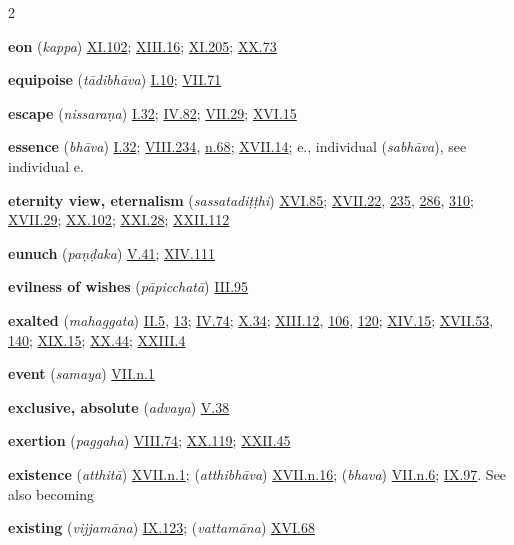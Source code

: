 \begin{multicols}{2}
\begin{vismHanging}
\par\textbf{eon} (\emph{kappa}) \hyperlink{XI.102}{XI.102}{}; \hyperlink{XIII.16}{XIII.16}{}; \hyperlink{XI.205}{XI.205}{}; \hyperlink{XX.73}{XX.73}{}
\par\textbf{equipoise} (\emph{tādibhāva}) \hyperlink{I.10}{I.10}{}; \hyperlink{VII.71}{VII.71}{}
\par\textbf{escape} (\emph{nissaraṇa}) \hyperlink{I.32}{I.32}{}; \hyperlink{IV.82}{IV.82}{}; \hyperlink{VII.29}{VII.29}{}; \hyperlink{XVI.15}{XVI.15}{}
\par\textbf{essence} (\emph{bhāva}) \hyperlink{I.32}{I.32}{}; \hyperlink{VIII.234}{VIII.234}{}, \hyperlink{VIII.n68}{n.68}{}; \hyperlink{XVII.14}{XVII.14}{}; e., individual (\emph{sabhāva}), see  individual e. 
\par\textbf{eternity view, eternalism} (\emph{sassatadiṭṭhi}) \hyperlink{XVI.85}{XVI.85}{}; \hyperlink{XVII.22}{XVII.22}{}, \hyperlink{XVII.235}{235}{}, \hyperlink{XVII.286}{286}{}, \hyperlink{XVII.310}{310}{}; \hyperlink{XVII.29}{XVII.29}{}; \hyperlink{XX.102}{XX.102}{}; \hyperlink{XXI.28}{XXI.28}{}; \hyperlink{XXII.112}{XXII.112}{}
\par\textbf{eunuch} (\emph{paṇḍaka}) \hyperlink{V.41}{V.41}{}; \hyperlink{XIV.111}{XIV.111}{}
\par\textbf{evilness of wishes} (\emph{pāpicchatā}) \hyperlink{III.95}{III.95}{}
\par\textbf{exalted} (\emph{mahaggata}) \hyperlink{II.5}{II.5}{}, \hyperlink{II.13}{13}{}; \hyperlink{IV.74}{IV.74}{}; \hyperlink{X.34}{X.34}{}; \hyperlink{XIII.12}{XIII.12}{}, \hyperlink{XIII.106}{106}{}, \hyperlink{XIII.120}{120}{}; \hyperlink{XIV.15}{XIV.15}{}; \hyperlink{XVII.53}{XVII.53}{}, \hyperlink{XVII.140}{140}{}; \hyperlink{XIX.15}{XIX.15}{}; \hyperlink{XX.44}{XX.44}{}; \hyperlink{XXIII.4}{XXIII.4}{}
\par\textbf{event} (\emph{samaya}) \hyperlink{VII.n1}{VII.n.1}{}
\par\textbf{exclusive, absolute} (\emph{advaya}) \hyperlink{V.38}{V.38}{}
\par\textbf{exertion} (\emph{paggaha}) \hyperlink{VIII.74}{VIII.74}{}; \hyperlink{XX.119}{XX.119}{}; \hyperlink{XXII.45}{XXII.45}{}
\par\textbf{existence} (\emph{atthitā}) \hyperlink{XVII.n1}{XVII.n.1}{}; (\emph{atthibhāva}) \hyperlink{XVII.n16}{XVII.n.16}{}; (\emph{bhava}) \hyperlink{VII.n6}{VII.n.6}{}; \hyperlink{IX.97}{IX.97}{}. See also becoming 
\par\textbf{existing} (\emph{vijjamāna}) \hyperlink{IX.123}{IX.123}{}; (\emph{vattamāna}) \hyperlink{XVI.68}{XVI.68}{}

\end{vismHanging}
\end{multicols}
